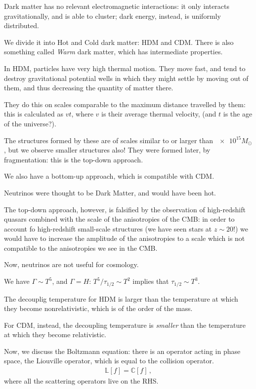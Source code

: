 \documentclass[main.tex]{subfiles}
\begin{document}
Dark matter has no relevant electromagnetic interactions: it only interacts gravitationally, and is able to cluster; dark energy, instead, is uniformly distributed. 

We divide it into Hot and Cold dark matter: HDM and CDM. 
There is also something called \emph{Warm} dark matter, which has intermediate properties.

In HDM, particles have very high thermal motion. They move fast, and tend to destroy gravitational potential wells in which they might settle by moving out of them, and thus decreasing the quantity of matter there. 

They do this on scales comparable to the maximum distance travelled by them: this is calculated as \(vt\), where \(v\) is their average thermal velocity, (and \(t\) is the age of the universe?). 

The structures formed by these are of scales similar  to or larger than \(\num{e15} M_{\odot}\), but we observe smaller structures also! They were formed later, by fragmentation: this is the top-down approach. 

We also have a bottom-up approach, which is compatible with CDM. 

Neutrinos were thought to be Dark Matter, and would have been hot. 

The top-down approach, however, is falsified by the observation of high-redshift quasars combined with the scale of the anisotropies of the CMB: in order to account fo high-redshift small-scale structures (we have seen stars at \(z \sim 20\)!) we would have to increase the amplitude of the anisotropies to a scale which is not compatible to the anisotropies we see in the CMB. 

Now, neutrinos are not useful for cosmology. 

We have \(\Gamma \sim T^{5}\), and \(\Gamma = H\): 
\(T^{5} / \tau_{1/2} \sim T^2\) implies that \(\tau_{1/2} \sim T^{3}\). 

The decouplig temperature for HDM is larger than the temperature at which they become nonrelativistic, which is of the order of the mass. 

For CDM, instead, the decoupling temperature is \emph{smaller} than the temperature at which they become relativistic. 

Now, we discuss the Boltzmann equation: there is an operator acting in phase space, the Liouville operator, which is equal to the collision operator.
%
\begin{align}
  \mathbb{L} [f] = \mathbb{C} [f]
\,,
\end{align}
%
where all the scattering operators live on the RHS. 
\end{document}
